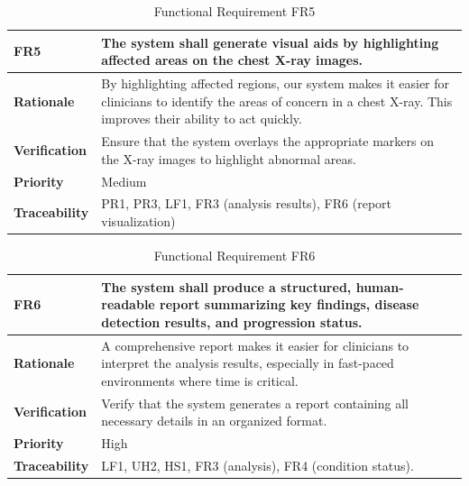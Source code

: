 \documentclass[12pt]{article}
\begin{document}
\begin{table}[h!]
\centering
{}
\begin{tabular}{|p{3.5cm}|p{11.5cm}|}
\hline
\rowcolor{gray!30}
\textbf{FR5} & The system shall generate visual aids by highlighting affected areas on the chest X-ray images. \\
\hline
\textbf{Rationale} & By highlighting affected regions, our system makes it easier for clinicians to identify the areas of concern in a chest X-ray. This improves their ability to act quickly. \\
\hline
\textbf{Verification} & Ensure that the system overlays the appropriate markers on the X-ray images to highlight abnormal areas. \\
\hline
\textbf{Priority} & Medium\\
\hline
\textbf{Traceability} & PR1, PR3, LF1, FR3 (analysis results), FR6 (report visualization) \\
\hline
\end{tabular}
\caption{Functional Requirement FR5}
\end{table}
\begin{table}[h!]
\centering
{}
\begin{tabular}{|p{3.5cm}|p{11.5cm}|}
\hline
\rowcolor{gray!30}
\textbf{FR6} & The system shall produce a structured, human-readable report summarizing key findings, disease detection results, and progression status. \\
\hline
\textbf{Rationale} & A comprehensive report makes it easier for clinicians to interpret the analysis results, especially in fast-paced environments where time is critical. \\
\hline
\textbf{Verification} & Verify that the system generates a report containing all necessary details in an organized format. \\
\hline
\textbf{Priority} & High \\
\hline
\textbf{Traceability} &  LF1, UH2, HS1, FR3 (analysis), FR4 (condition status). \\
\hline
\end{tabular}
\caption{Functional Requirement FR6}
\end{table}
\end{document}
